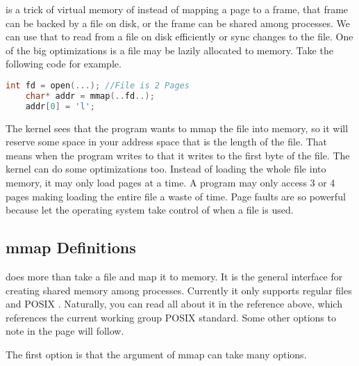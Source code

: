	 is a trick of virtual memory of instead of mapping a page to a frame, that frame can be backed by a file on disk, or the frame can be shared among processes.
	We can use that to read from a file on disk efficiently or sync changes to the file.
	One of the big optimizations is a file may be lazily allocated to memory.
	Take the following code for example.
	 
	\begin{lstlisting}[language=C]
	int fd = open(...); //File is 2 Pages
	char* addr = mmap(..fd..);
	addr[0] = 'l';
	\end{lstlisting}
	 
	The kernel sees that the program wants to mmap the file into memory, so it will reserve some space in your address space that is the length of the file.
	That means when the program writes to  that it writes to the first byte of the file.
	The kernel can do some optimizations too.
	Instead of loading the whole file into memory, it may only load pages at a time.
	A program may only access 3 or 4 pages making loading the entire file a waste of time.
	Page faults are so powerful because let the operating system take control of when a file is used.
	 
	\subsection{mmap Definitions}
	 
	 does more than take a file and map it to memory.
	It is the general interface for creating shared memory among processes.
	Currently it only supports regular files and POSIX  \cite{mmap_2018}.
	Naturally, you can read all about it in the reference above, which references the current working group POSIX standard.
	Some other options to note in the page will follow.
	 
	The first option is that the  argument of mmap can take many options.
	 
